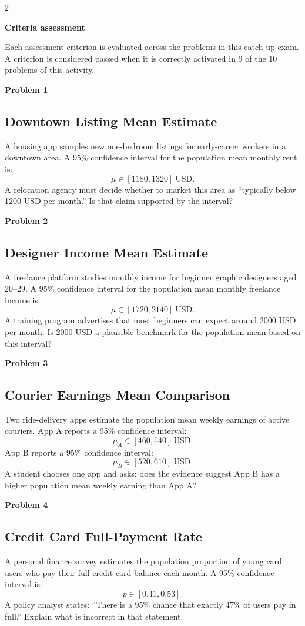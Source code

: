 \documentclass[12pt]{article}
\newcommand{\SubsectionBox}[1]{%
\noindent\colorbox{gray!30}{\parbox{\linewidth}{\textbf{#1}}}\par\vspace{0.35cm}%
}
\begin{document}
\begin{multicols}{2}
	\SubsectionBox{Criteria assessment}\vspace{-0.25cm}
	Each assessment criterion is evaluated across the problems in this catch-up exam. A criterion is considered passed when it is correctly activated in 9 of the 10 problems of this activity.

	\vspace{0.25cm}
\SubsectionBox{Problem 1}
\subsection*{Downtown Listing Mean Estimate}
A housing app samples new one-bedroom listings for early-career workers in a downtown area.
		A 95\% confidence interval for the population mean monthly rent is:
		\[
		\mu \in [1180, 1320]\ \text{USD}.
		\]
		A relocation agency must decide whether to market this area as ``typically below 1200 USD per month.''
		Is that claim supported by the interval?

\vspace{0.5cm}
\SubsectionBox{Problem 2}
\subsection*{Designer Income Mean Estimate}
A freelance platform studies monthly income for beginner graphic designers aged 20--29.
		A 95\% confidence interval for the population mean monthly freelance income is:
		\[
		\mu \in [1720, 2140]\ \text{USD}.
		\]
		A training program advertises that most beginners can expect around 2000 USD per month.
		Is 2000 USD a plausible benchmark for the population mean based on this interval?

\vspace{0.5cm}
\SubsectionBox{Problem 3}
\subsection*{Courier Earnings Mean Comparison}
Two ride-delivery apps estimate the population mean weekly earnings of active couriers.
		App A reports a 95\% confidence interval:
		\[
		\mu_A \in [460, 540]\ \text{USD}.
		\]
		App B reports a 95\% confidence interval:
		\[
		\mu_B \in [520, 610]\ \text{USD}.
		\]
		A student chooses one app and asks: does the evidence suggest App B has a higher population mean weekly earning than App A?

\vspace{0.5cm}
\SubsectionBox{Problem 4}
\subsection*{Credit Card Full-Payment Rate}
A personal finance survey estimates the population proportion of young card users who pay their full credit card balance each month.
		A 95\% confidence interval is:
		\[
		p \in [0.41, 0.53].
		\]
		A policy analyst states: ``There is a 95\% chance that exactly 47\% of users pay in full.''
		Explain what is incorrect in that statement.


\end{multicols}
\end{document}
